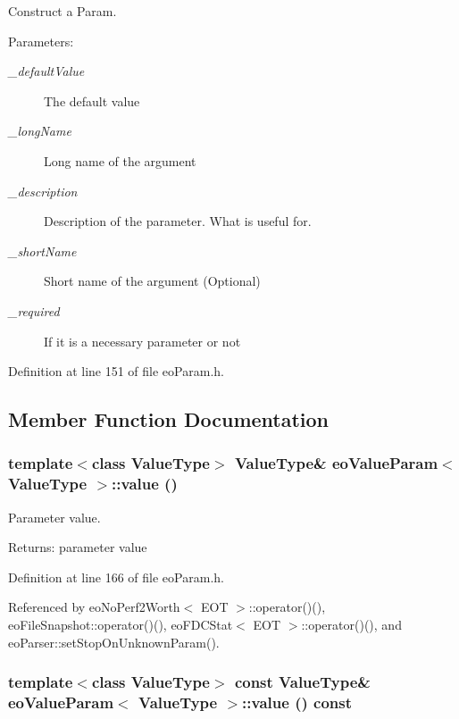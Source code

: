 Construct a Param. 

\begin{Desc}
\item[Parameters:]
\begin{description}
\item[{\em \_\-default\-Value}]The default value \item[{\em \_\-long\-Name}]Long name of the argument \item[{\em \_\-description}]Description of the parameter. What is useful for. \item[{\em \_\-short\-Name}]Short name of the argument (Optional) \item[{\em \_\-required}]If it is a necessary parameter or not \end{description}
\end{Desc}


Definition at line 151 of file eo\-Param.h.

\subsection{Member Function Documentation}
\subsubsection{\setlength{\rightskip}{0pt plus 5cm}template$<$class Value\-Type$>$ Value\-Type\& {\bf eo\-Value\-Param}$<$ Value\-Type $>$::value ()\hspace{0.3cm}{\tt  [inline]}}\label{classeo_value_param_a2}


Parameter value. 

\begin{Desc}
\item[Returns:]parameter value \end{Desc}


Definition at line 166 of file eo\-Param.h.

Referenced by eo\-No\-Perf2Worth$<$ EOT $>$::operator()(), eo\-File\-Snapshot::operator()(), eo\-FDCStat$<$ EOT $>$::operator()(), and eo\-Parser::set\-Stop\-On\-Unknown\-Param().
\subsubsection{\setlength{\rightskip}{0pt plus 5cm}template$<$class Value\-Type$>$ const Value\-Type\& {\bf eo\-Value\-Param}$<$ Value\-Type $>$::value () const\hspace{0.3cm}{\tt  [inline]}}\label{classeo_value_param_a3}


